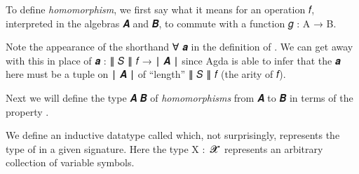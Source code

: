 \documentclass[a4paper,UKenglish,cleveref,autoref,thm-restate]{lipics-v2021}
\begin{document}
To define \emph{homomorphism}, we first say what it means for an operation \ab 𝑓, interpreted in the algebras \ab 𝑨 and \ab 𝑩, to commute with a function \ab 𝑔 \as : \ab A \as → \ab B.
\ccpad
\begin{code}

\end{code}
\ccpad
Note the appearance of the shorthand \as ∀ \ab 𝒂 in the definition of . We can get away with this in place of \ab 𝒂 \as : \af ∥ \ab 𝑆 \af ∥ \ab 𝑓 \as → \af ∣ \ab 𝑨 \af ∣ since Agda is able to infer that the \ab 𝒂 here must be a tuple on \af ∣ \ab 𝑨 \af ∣ of ``length'' \af ∥ \ab 𝑆 \af ∥ \ab 𝑓 (the arity of \ab 𝑓).

Next we will define the type  \ab 𝑨 \ab 𝑩 of \emph{homomorphisms} from \ab 𝑨 to \ab 𝑩 in terms of the property .
\ccpad
\begin{code}%

\end{code}
\ccpad

We define an inductive datatype called  which, not surprisingly, represents the type of  in a given signature. Here the type \ab X \as :~\ab 𝓧 \af ̇ represents an arbitrary collection of variable symbols.
\ccpad
\begin{code}%
\>[0]\AgdaSpace{}%
\AgdaSpace{}%
\AgdaSymbol{\{}\AgdaSpace{}%
\AgdaSymbol{:}\AgdaSpace{}%
\AgdaSymbol{\}\{}\AgdaSpace{}%
\AgdaSymbol{:}\AgdaSpace{}%
\AgdaSpace{}%
\AgdaSymbol{\}}\AgdaSpace{}%
\AgdaSymbol{:}\AgdaSpace{}%
\AgdaSpace{}%
\AgdaSpace{}%
\AgdaSpace{}%
\AgdaSpace{}%
\AgdaSpace{}%
\AgdaSpace{}%
%
\>[51]\<%
\\
\>[0][@{}l@{\AgdaIndent{0}}]%
\>[2]\AgdaSpace{}%
\AgdaSymbol{:}\AgdaSpace{}%
\AgdaSpace{}%
\AgdaSpace{}%
\AgdaSymbol{\{}\AgdaSymbol{\}\{}\AgdaSymbol{\}}\<%
\\
%
\>[2]\AgdaSpace{}%
\AgdaSymbol{:}\AgdaSpace{}%
\AgdaSymbol{(}\AgdaSpace{}%
\AgdaSymbol{:}\AgdaSpace{}%
\AgdaSpace{}%
\AgdaSpace{}%
\AgdaSymbol{)(}\AgdaSpace{}%
\AgdaSymbol{:}\AgdaSpace{}%
\AgdaSpace{}%
\AgdaSpace{}%
\AgdaSpace{}%
\AgdaSpace{}%
\AgdaSpace{}%
\AgdaSymbol{\{}\AgdaSymbol{\}\{}\AgdaSymbol{\})}\AgdaSpace{}%
\AgdaSpace{}%
\<%
\end{code}
\end{document}
